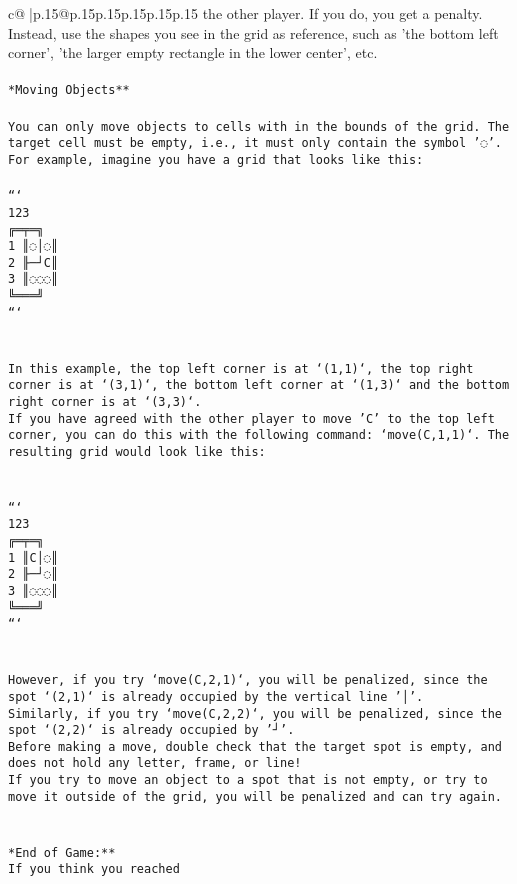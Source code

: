 \documentclass{article}
\begin{document}
{\begin{supertabular}{c@{$\;$}|p{.15\linewidth}@{}p{.15\linewidth}p{.15\linewidth}p{.15\linewidth}p{.15\linewidth}p{.15\linewidth}}
{{{the other player. If you do, you get a penalty. Instead, use the shapes you see in the grid as reference, such as 'the bottom left corner', 'the larger empty rectangle in the lower center', etc.\\ \tt \\ \tt **Moving Objects**\\ \tt \\ \tt * You can only move objects to cells with in the bounds of the grid. The target cell must be empty, i.e., it must only contain the symbol '◌'.\\ \tt * For example, imagine you have a grid that looks like this: \\ \tt \\ \tt ```\\ \tt     123\\ \tt    ╔═╤═╗\\ \tt  1 ║◌│◌║\\ \tt  2 ╟─┘C║\\ \tt  3 ║◌◌◌║\\ \tt    ╚═══╝\\ \tt ```\\ \tt \\ \tt \\ \tt * In this example, the top left corner is at `(1,1)`, the top right corner is at `(3,1)`, the bottom left corner at `(1,3)` and the bottom right corner is at `(3,3)`.\\ \tt * If you have agreed with the other player to move 'C' to the top left corner, you can do this with the following command: `move(C,1,1)`. The resulting grid would look like this: \\ \tt \\ \tt \\ \tt ```\\ \tt     123\\ \tt    ╔═╤═╗\\ \tt  1 ║C│◌║\\ \tt  2 ╟─┘◌║\\ \tt  3 ║◌◌◌║\\ \tt    ╚═══╝\\ \tt ```\\ \tt \\ \tt \\ \tt * However, if you try `move(C,2,1)`, you will be penalized, since the spot `(2,1)` is already occupied by the vertical line '│'.\\ \tt * Similarly, if you try `move(C,2,2)`, you will be penalized, since the spot `(2,2)` is already occupied by '┘'.\\ \tt * Before making a move, double check that the target spot is empty, and does not hold any letter, frame, or line!\\ \tt * If you try to move an object to a spot that is not empty, or try to move it outside of the grid, you will be penalized and can try again.\\ \tt \\ \tt \\ \tt **End of Game:**\\ \tt If you think you reached }}}
\end{supertabular}}
\end{document}
